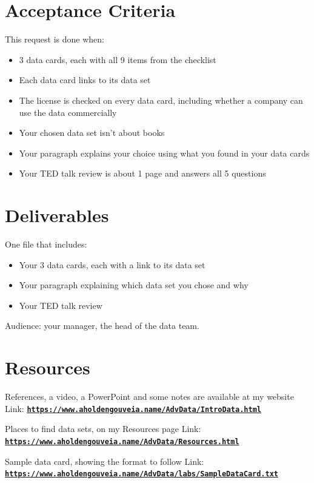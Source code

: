 \documentclass[12pt]{article}
\begin{document}
\section*{Acceptance Criteria}
This request is done when:
\begin{itemize}
    \item 3 data cards, each with all 9 items from the checklist
    \item Each data card links to its data set
    \item The license is checked on every data card, including whether a company can use the data commercially
    \item Your chosen data set isn't about books
    \item Your paragraph explains your choice using what you found in your data cards
    \item Your TED talk review is about 1 page and answers all 5 questions
\end{itemize}

\section*{Deliverables}
One file that includes:
\begin{itemize}
    \item Your 3 data cards, each with a link to its data set
    \item Your paragraph explaining which data set you chose and why
    \item Your TED talk review
\end{itemize}

Audience: your manager, the head of the data team.

\section*{Resources}
References, a video, a PowerPoint and some notes are available at my website
Link: \href{https://www.aholdengouveia.name/AdvData/IntroData.html}{\textbf{\nolinkurl{https://www.aholdengouveia.name/AdvData/IntroData.html}}}

Places to find data sets, on my Resources page
Link: \href{https://www.aholdengouveia.name/AdvData/Resources.html}{\textbf{\nolinkurl{https://www.aholdengouveia.name/AdvData/Resources.html}}}

Sample data card, showing the format to follow
Link: \href{https://www.aholdengouveia.name/AdvData/labs/SampleDataCard.txt}{\textbf{\nolinkurl{https://www.aholdengouveia.name/AdvData/labs/SampleDataCard.txt}}}
\end{document}
